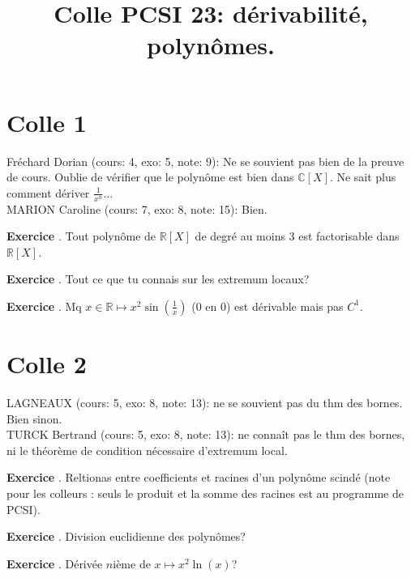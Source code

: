 \documentclass[10pt,a4paper]{article}
\title{Colle PCSI 23: dérivabilité, polynômes.}
\newcounter{question}
\newcounter{exo}
\newenvironment{exo}{\vspace{0.5cm}\setcounter{question}{0}\addtocounter{exo}{1} \noindent \textbf{Exercice \theexo}. \normalsize }{\par}
\begin{document}
	\maketitle
	
	\section*{Colle 1}
	\setcounter{exo}{0}
	Fréchard Dorian (cours: 4, exo: 5, note: 9): Ne se souvient pas bien de la preuve de cours. Oublie de vérifier que le polynôme est bien dans $\mathbb{C}[X]$. Ne sait plus comment dériver $\frac{1}{x^n}$...\\
	MARION Caroline (cours: 7, exo: 8, note: 15): Bien.\\
	
	\begin{exo}
		Tout polynôme de $\mathbb{R}[X]$ de degré au moins 3 est factorisable dans $\mathbb{R}[X]$.
	\end{exo}

	\begin{exo}
		Tout ce que tu connais sur les extremum locaux?
	\end{exo}
	
	\begin{exo}
		Mq $x \in \mathbb{R} \longmapsto x^2 \sin(\frac{1}{x})$ (0 en 0) est dérivable mais pas $C^1$. 
	\end{exo}	
	
	\section*{Colle 2}
	\setcounter{exo}{0}
	LAGNEAUX (cours: 5, exo: 8, note: 13): ne se souvient pas du thm des bornes. Bien sinon.\\	
	TURCK Bertrand (cours: 5, exo: 8, note: 13): ne connaît pas le thm des bornes, ni le théorème de condition nécessaire d'extremum local.\\
		
	\begin{exo}
		Reltionas entre coefficients et racines d'un polynôme scindé (note pour les colleurs : seuls le produit et la somme des racines est au programme de PCSI). 
	\end{exo}		

	\begin{exo}
		Division euclidienne des polynômes?
	\end{exo}

	\begin{exo}
		Dérivée $n$ième de $x \longmapsto x^2 \ln(x)$?
	\end{exo}
	
\end{document}
